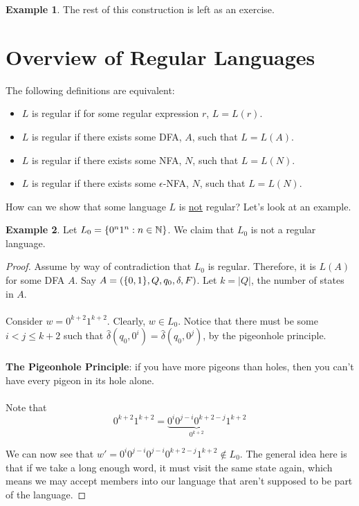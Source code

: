 \documentclass[]{article}
\DeclarePairedDelimiter{\set}{\lbrace}{\rbrace}
\theoremstyle{definition}
\newtheorem{ex}{Example}[section]
\newcommand{\lecture}[1]{\marginpar{{\footnotesize $\leftarrow$ \underline{#1}}}}
\begin{document}
\begin{ex}
          The rest of this construction is left as an exercise.
        \end{ex}

      \section{Overview of Regular Languages} \lecture{October 3, 2013}
        The following definitions are equivalent:
        \begin{itemize}
          \item $L$ is regular if for some regular expression $r$, $L = L(r)$.
          \item $L$ is regular if there exists some DFA, $A$, such that $L = L(A)$.
          \item $L$ is regular if there exists some NFA, $N$, such that $L = L(N)$.
          \item $L$ is regular if there exists some $\epsilon$-NFA, $N$, such that $L = L(N)$.
        \end{itemize}

        How can we show that some language $L$ is \underline{not} regular? Let's look at an example.
        \begin{ex}
          Let $L_0 = \set{ 0^n1^n : n \in \mathbb{N} }$. We claim that $L_0$ is not a regular language.

          \begin{proof}
            Assume by way of contradiction that $L_0$ is regular. Therefore, it is $L(A)$ for some DFA $A$. Say $A = (\set{0, 1}, Q, q_0, \delta, F)$. Let $k = |Q|$, the number of states in $A$.
            \\ \\
            Consider $w = 0^{k + 2}1^{k + 2}$. Clearly, $w \in L_0$. Notice that there must be some $i < j \le k + 2$ such that $\hat{\delta}(q_0, 0^i) = \hat{\delta}(q_0, 0^j)$, by the pigeonhole principle.
            \\ \\
            \textbf{The Pigeonhole Principle}: if you have more pigeons than holes, then you can't have every pigeon in its hole alone.
            \\ \\
            Note that
            $$
            0^{k + 2}1^{k+2} = \underbrace{0^i 0^{j - i}0^{k + 2 - j}}_{0^{k+2}} 1^{k+2}
            $$

            We can now see that $w' = 0^i 0^{j - i} 0^{j - i} 0^{k + 2 - j}1^{k + 2} \not \in L_0$. The general idea here is that if we take a long enough word, it must visit the same state again, which means we may accept members into our language that aren't supposed to be part of the language.
          \end{proof}
        \end{ex}
\end{document}

